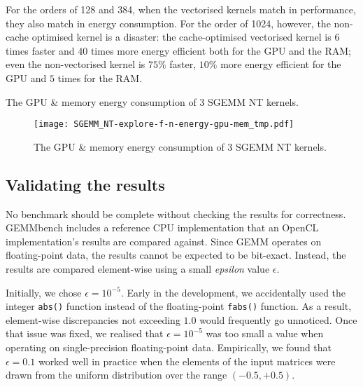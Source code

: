 \documentclass{acm_proc_article-sp} %
\begin{document}
For the orders of 128 and 384, when the vectorised kernels match in
performance, they also match in energy consumption.
%
For the order of 1024, however, the non-cache optimised kernel is a disaster:
%
the cache-optimised vectorised kernel is $6$ times faster and $40$ times more
energy efficient both for the GPU and the RAM;
%
even the non-vectorised kernel is $75\%$ faster, $10\%$ more energy efficient
for the GPU and $5$ times for the RAM.

\begin{table*}
  \centering
  \caption{\label{SGEMM_NT:df:energy}The GPU \& memory energy consumption of 3 SGEMM NT kernels.}
  
\end{table*}

\begin{figure*}
  \texttt{[image: SGEMM\_NT-explore-f-n-energy-gpu-mem\_tmp.pdf]}
  \caption{The GPU \& memory energy consumption of 3 SGEMM NT kernels.}
  \label{SGEMM_NT:plot:energy}
\end{figure*}


\subsection{Validating the results}
\label{sec:validating}

No benchmark should be complete without checking the results for correctness.
%
GEMMbench includes a reference CPU implementation that an OpenCL
implementation's results are compared against.
%
Since GEMM operates on floating-point data, the results cannot be expected to be
bit-exact.
%
Instead, the results are compared element-wise using a small {\em epsilon}
value $\epsilon$.

Initially, we chose $\epsilon = 10^{-5}$.
%
Early in the development, we accidentally used the integer \verb|abs()|
function instead of the floating-point \verb|fabs()| function.
%
As a result, element-wise discrepancies not exceeding $1.0$ would frequently go
unnoticed.
%
Once that issue was fixed, we realised that $\epsilon = 10^{-5}$ was too small
a value when operating on single-precision floating-point data.
%
Empirically, we found that $\epsilon = 0.1$ worked well in practice when the
elements of the input matrices were drawn from the uniform distribution over
the range $(-0.5, +0.5)$.
%
\end{document}
